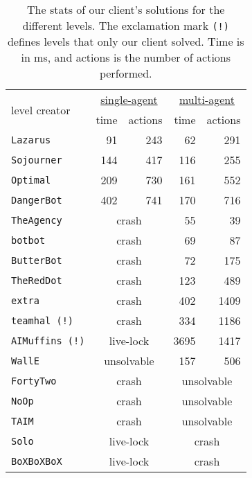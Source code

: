 
\begin{table}
  \centering
  \begin{tabular}{lrrrr}
    \toprule
    \multirow{2}{*}{level creator} & \multicolumn{2}{c}{\underline{single-agent}} & \multicolumn{2}{c}{\underline{multi-agent}} \\
                                   & time & actions & time & actions \\ \midrule
    \texttt{Lazarus}              & 91  & 243 & 62   & 291 \\
    \texttt{Sojourner}            & 144 & 417 & 116  & 255 \\
    \texttt{Optimal}              & 209 & 730 & 161  & 552 \\
    \texttt{DangerBot}            & 402 & 741 & 170  & 716 \\
    \texttt{TheAgency}            & \multicolumn{2}{c}{crash}      & 55   & 39 \\ 
    \texttt{botbot}               & \multicolumn{2}{c}{crash}      & 69   & 87 \\
    \texttt{ButterBot}            & \multicolumn{2}{c}{crash}      & 72   & 175 \\
    \texttt{TheRedDot}            & \multicolumn{2}{c}{crash}      & 123  & 489 \\ 
    \texttt{extra}                & \multicolumn{2}{c}{crash}      & 402  & 1409 \\
    \texttt{teamhal \hfill(!)}    & \multicolumn{2}{c}{crash}      & 334  & 1186 \\ 
    \texttt{AIMuffins \hfill(!)}  & \multicolumn{2}{c}{live-lock}  & 3695 & 1417 \\ 
    \texttt{WallE}                & \multicolumn{2}{c}{unsolvable} & 157  & 506 \\
    \texttt{FortyTwo}             & \multicolumn{2}{c}{crash}      & \multicolumn{2}{c}{unsolvable} \\
    \texttt{NoOp}                 & \multicolumn{2}{c}{crash}      & \multicolumn{2}{c}{unsolvable} \\
    \texttt{TAIM}                 & \multicolumn{2}{c}{crash}      & \multicolumn{2}{c}{unsolvable} \\
    \texttt{Solo}                 & \multicolumn{2}{c}{live-lock}  & \multicolumn{2}{c}{crash}      \\
    \texttt{BoXBoXBoX}            & \multicolumn{2}{c}{live-lock}  & \multicolumn{2}{c}{crash}      \\
    \bottomrule
  \end{tabular}
  \caption{\label{tab:competition results}The stats of our client's solutions for the different levels. The exclamation mark \texttt{(!)} defines levels that only our client solved. Time is in ms, and actions is the number of actions performed.}
\end{table}

